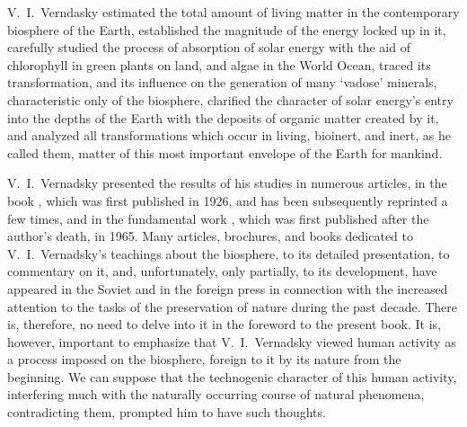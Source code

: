 V.~I.\ Verndasky estimated the total amount of living matter in the
contemporary biosphere of the Earth, established the magnitude of the energy
locked up in it, carefully studied the process of absorption of solar energy
with the aid of chlorophyll in green plants on land, and algae in the World
Ocean, traced its transformation, and its influence on the generation of many
`vadose' minerals, characteristic only of the
biosphere, clarified the character of solar energy's entry into the depths of
the Earth with the deposits of organic matter created by it, and analyzed all
transformations which occur in living, bioinert, and inert, as he called them,
matter of this most important envelope of the Earth for mankind.

V.~I.\ Vernadsky presented the results of his studies in numerous articles, in
the book , which was first published in 1926, and
has been subsequently reprinted a few times, and in the fundamental work
, which was first published after the author's
death, in 1965.  Many articles, brochures, and books dedicated to V.~I.\
Vernadsky's teachings about the biosphere, to its detailed presentation, to
commentary on it, and, unfortunately, only partially, to its development, have
appeared in the Soviet and in the foreign press in connection with the
increased attention to the tasks of the preservation of
nature during the past decade.  There is,
therefore, no need to delve into it in the foreword to the present book.  It
is, however, important to emphasize that V.~I.\ Vernadsky viewed human activity
as a process imposed on the biosphere, foreign to it by its nature from the
beginning.  We can suppose that the technogenic character of this human
activity, interfering much with the naturally occurring course of natural
phenomena,\footnoteRus{естественный ход природных процессов} contradicting
them, prompted him to have such thoughts.

